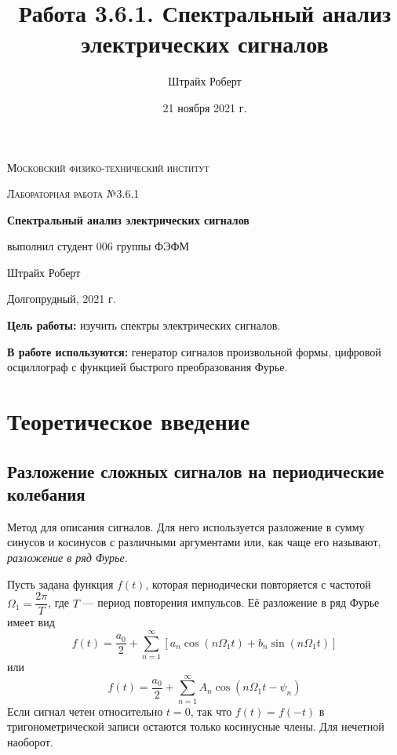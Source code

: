 \documentclass[a4paper, 12pt]{article}
\author{Штрайх Роберт}
\title{Работа 3.6.1. Спектральный анализ электрических сигналов}
\date{21 ноября 2021 г.}
\begin{document}
\begin{titlepage}
	\centering
	\vspace{5cm}
	{\scshape\LARGE Московский физико-технический институт \par}
	\vspace{4cm}
	{\scshape\Large Лабораторная работа №3.6.1 \par}
	\vspace{1cm}
	{\huge\bfseries Спектральный анализ электрических сигналов\par}
	\vspace{1cm}
	\vfill
\begin{flushright}
	{\Large выполнил студент 006 группы ФЭФМ}\par
	\vspace{0.3cm}
	{\Large Штрайх Роберт}
\end{flushright}
	

	\vfill

	Долгопрудный, 2021 г.
\end{titlepage}

\newpage

\textbf{Цель работы:} изучить спектры электрических сигналов.

\textbf{В работе используются:} генератор сигналов произвольной формы, цифровой осциллограф с функцией быстрого преобразования Фурье.

\section{Теоретическое введение}
\subsection*{Разложение сложных сигналов на периодические колебания}

Метод для описания сигналов. Для него используется разложение в сумму синусов и косинусов с различными аргументами или, как чаще его называют, \textit{разложение в ряд Фурье}.

Пусть задана функция $f(t)$, которая периодически повторяется с частотой $\Omega_1 = \dfrac{2\pi}{T}$, где $T$ --- период повторения импульсов. Её разложение в ряд Фурье имеет вид 
\begin{equation}
f(t) = \dfrac{a_0}{2} + \sum\limits_{n = 1}^{\infty}\left[a_n \cos \left(n \Omega_1t\right) + b_n \sin \left(n \Omega_1t\right)\right]
\end{equation}
или
\begin{equation}
f(t) = \dfrac{a_0}{2} + \sum\limits_{n = 1}^{\infty}A_n \cos \left(n\Omega_1t-\psi_n\right)
\end{equation}
Если сигнал четен относительно $t=0$, так что $f(t) = f(-t)$ в тригонометрической записи остаются только косинусные члены. Для нечетной наоборот.
\end{document}
